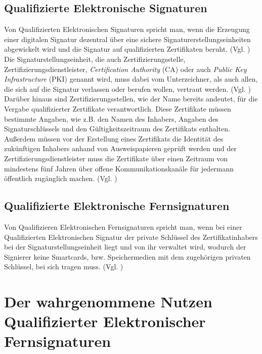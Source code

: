 \documentclass[deutsch]{lib/llncs/llncs}
\begin{document}
\subsection{Qualifizierte Elektronische Signaturen}
Von Qualifizierten Elektronischen Signaturen spricht man, wenn die Erzeugung einer digitalen Signatur dezentral über eine sichere Signaturerstellungseinheiten abgewickelt wird und die Signatur auf qualifizierten Zertifikaten beruht. (Vgl. \cite[S. 8]{Zitat07}) \\
Die Signaturstellungseinheit, die auch Zertifizierungsstelle, Zertifizierungsdienstleister, \textit{Certification Authority} (CA) oder auch \textit{Public Key Infrastructure} (PKI) genannt wird, muss dabei vom Unterzeichner, als auch allen, die sich auf die Signatur verlassen oder berufen wollen, vertraut werden. (Vgl. \cite[S. 9]{Zitat07}) \\
Darüber hinaus sind Zertifizierungsstellen, wie der Name bereits andeutet, für die Vergabe qualifizierter Zertifikate verantwortlich. 
Diese Zertifikate müssen bestimmte Angaben, wie z.B. den Namen des Inhabers, Angaben des Signaturschlüssels und den Gültigkeitszeitraum des Zertifikats enthalten. Außerdem müssen vor der Erstellung eines Zertifikats die Identität des zukünftigen Inhabers anhand von Ausweispapieren geprüft werden und der Zertifizierungsdienstleister muss die Zertifikate über einen Zeitraum von mindestens fünf Jahren über offene Kommunikationskanäle für jedermann öffentlich zugänglich machen. (Vgl. \cite[S. 9]{Zitat07}) 


\subsection{Qualifizierte Elektronische Fernsignaturen}
Von Qualifizieren Elektronischen Fernsignaturen spricht man, wenn bei einer Qualifizierten Elektronischen Signatur der private Schlüssel des Zertifikatinhabers bei der Signaturstellungseinheit liegt und von ihr verwaltet wird, wodurch der Signierer keine Smartcards, bzw. Speichermedien mit dem zugehörigen privaten Schlüssel, bei sich tragen muss. (Vgl. \cite[S. 30]{Zitat08})


\section{Der wahrgenommene Nutzen Qualifizierter Elektronischer Fernsignaturen}
\end{document}
